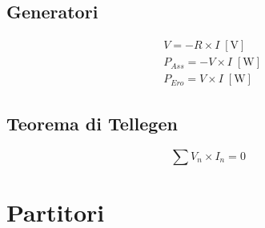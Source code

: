 \documentclass{article}
\begin{document}
        \begin{minipage}[t]{.3\textwidth}
            \vspace{-\baselineskip}

            \subsection*{Generatori}
            
                \begin{minipage}[t]{.2\textwidth}
                    \vspace{-\baselineskip}

                    
                \end{minipage}
                \hfill
                \begin{minipage}[t]{.8\textwidth}
                    \vspace{-\baselineskip}

                    \begin{align*}
                        &V = - R \times I \; [\mathrm{V}]\\
                        &P_{Ass} = - V \times I \; [\mathrm{W}]\\
                        &P_{Ero} = V \times I \; [\mathrm{W}]
                    \end{align*}
                \end{minipage}

        \end{minipage}
        \hfill
        \begin{minipage}[t]{.3\textwidth}
            \vspace{-\baselineskip}

            \subsection*{Teorema di Tellegen}

                \[
                    \sum V_n \times I_n = 0
                \]

        \end{minipage}

    \vspace{-2\baselineskip}
    \section*{Partitori}
\end{document}
